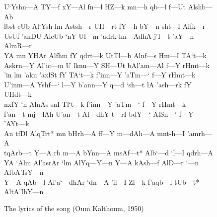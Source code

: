 \documentclass[11pt,a4paper]{article}
\begin{document}
\begin{figure*}[p]
{\begin{center}
\begin{minipage}{10cm}
U`Yshn--\kesh--A TY--\kesh--f xY--\kesh--Al fn--\kesh--l HZ--\kesh--k mn--\kesh--h qb--\kesh--l f--\kesh--Ut Alshb--\kesh--Ab\\
lbst cUb Al`Ysh lm Astsh--\kesh--r UH--\kesh--rt fY--\kesh--h bY--\kesh--n sht--\kesh--I Alfk--\kesh--r\\
UsUf 'anDU AlcUb `nY Ul--\kesh--m 'adrk lm--\kesh--AdhA j'I--\kesh--t 'aY--\kesh--n AlmR--\kesh--r\\
YA mn YHAr Alfhm fY qdrt--\kesh--k UtTl--\kesh--b Alnf--\kesh--s Hm--\kesh--I TA`t--\kesh--k\\
Askrn--\kesh--Y Al'ic--\kesh--m U lknn--\kesh--Y SH--\kesh--Ut bAl'am--\kesh--Al f--\kesh--Y rHmt--\kesh--k\\
'in lm 'akn 'axlSt fY TA`t--\kesh--k f'inn--\kesh--Y 'aTm--\kesh--` f--\kesh--Y rHmt--\kesh--k\\
U'inm--\kesh--A Yshf--\kesh--` l--\kesh--Y b'ann--\kesh--Y q--\kesh--d `sh--\kesh--t lA 'ash--\kesh--rk fY UHdt--\kesh--k\\
nxfY `n AlnAs snI Tl`t--\kesh--k f'inn--\kesh--Y 'aTm--\kesh--` f--\kesh--Y rHmt--\kesh--k\\
f'an--\kesh--t mj--\kesh--lAh U'an--\kesh--t Al--\kesh--dhY t--\kesh--rI bdY--\kesh--` AlSn--\kesh--` f--\kesh--Y 'AYt--\kesh--k\\
An tfDl AlqTrt* mn bHrh--\kesh--A ff--\kesh--Y m--\kesh--dAh--\kesh--A mnt-h--\kesh--I 'amrh--\kesh--A\\
tqArb--\kesh--t Y--\kesh--A rb m--\kesh--A bYnn--\kesh--A msAf--\kesh--t* Alb`--\kesh--d `l--\kesh--I qdrh--\kesh--A\\
YA `Alm Al'asrAr `lm AlYq--\kesh--Y--\kesh--n Y--\kesh--A kAsh--\kesh--f AlD--\kesh--r `--\kesh--n AlbA'IsY--\kesh--n\\
Y--\kesh--A qAb--\kesh--l Al'a`--\kesh--dhAr `dn--\kesh--A 'il--\kesh--I Zl--\kesh--k f'aqb--\kesh--l tUb--\kesh--t* AltA'IbY--\kesh--n
\end{minipage}
\end{center}}
\caption{The lyrics of the song  (Oum Kalthoum, 1950) \cite{oum}\label{oum}}
\end{figure*}
\end{document}

